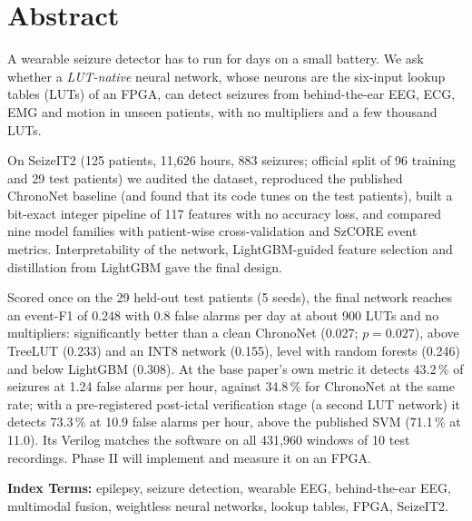 \chapter*{Abstract}

A wearable seizure detector has to run for days on a small battery. We ask whether a \emph{LUT-native} neural network,
whose neurons are the six-input lookup tables (LUTs) of an FPGA, can detect seizures from behind-the-ear EEG, ECG, EMG
and motion in unseen patients, with no multipliers and a few thousand LUTs.

On SeizeIT2 (125 patients, 11,626 hours, 883 seizures; official split of 96 training and 29 test patients) we audited
the dataset, reproduced the published ChronoNet baseline (and found that its code tunes on the test patients),
built a bit-exact integer pipeline of 117 features with no accuracy loss, and compared nine model families with
patient-wise cross-validation and SzCORE event metrics. Interpretability of the network, LightGBM-guided feature
selection and distillation from LightGBM gave the final design.

Scored once on the 29 held-out test patients (5 seeds), the final network reaches an event-F1 of 0.248 with 0.8 false
alarms per day at about 900 LUTs and no multipliers: significantly better than a clean ChronoNet (0.027; $p = 0.027$),
above TreeLUT (0.233) and an INT8 network (0.155), level with random forests (0.246) and below LightGBM (0.308).
At the base paper's own metric it detects 43.2\,\% of seizures at 1.24 false alarms per hour, against 34.8\,\% for
ChronoNet at the same rate; with a pre-registered post-ictal verification stage (a second LUT network) it detects
73.3\,\% at 10.9 false alarms per hour, above the published SVM (71.1\,\% at 11.0). Its Verilog matches the software on all 431,960 windows of 10 test recordings. Phase II
will implement and measure it on an FPGA.

\vspace{4mm}
\noindent\textbf{Index Terms:} epilepsy, seizure detection, wearable EEG, behind-the-ear EEG, multimodal fusion,
weightless neural networks, lookup tables, FPGA, SeizeIT2.
